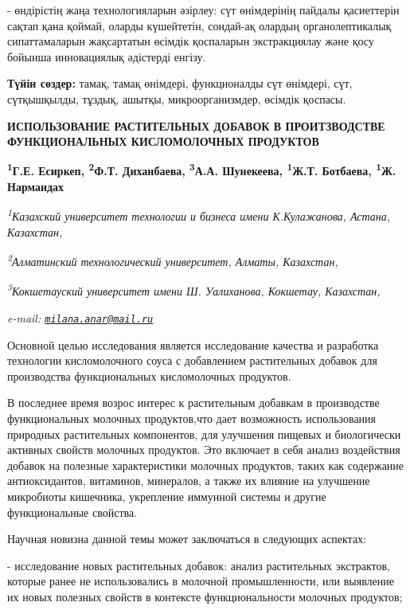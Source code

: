 - өндірістің жаңа технологияларын әзірлеу: сүт өнімдерінің пайдалы
қасиеттерін сақтап қана қоймай, оларды күшейтетін, сондай-ақ олардың
органолептикалық сипаттамаларын жақсартатын өсімдік қоспаларын
экстракциялау және қосу бойынша инновациялық әдістерді енгізу.

{\bfseries Түйін сөздер:} тамақ, тамақ өнімдері, функционалды сүт өнімдері,
сүт, сүтқышқылды, тұздық, ашытқы, микроорганизмдер, өсімдік қоспасы.

\begin{articleheader}
{\bfseries ИСПОЛЬЗОВАНИЕ РАСТИТЕЛЬНЫХ ДОБАВОК В ПРОИТЗВОДСТВЕ ФУНКЦИОНАЛЬНЫХ КИСЛОМОЛОЧНЫХ ПРОДУКТОВ}

{\bfseries
\textsuperscript{1}Г.Е. Есиркеп\textsuperscript{\envelope },
\textsuperscript{2}Ф.Т. Диханбаева,
\textsuperscript{3}А.А. Шунекеева,
\textsuperscript{1}Ж.Т. Ботбаева,
\textsuperscript{1}Ж. Нармандах}
\end{articleheader}

\begin{affiliation}
\emph{\textsuperscript{1}Казахский университет технологии и бизнеса имени К.Кулажанова, Астана, Казахстан,}

\emph{\textsuperscript{2}Алматинский технологический университет, Алматы, Казахстан,}

\emph{\textsuperscript{3}Кокшетауский университет имени Ш. Уалиханова, Кокшетау, Казахстан,}

\emph{e-mail: \href{mailto:milana.anar@mail.ru}{\nolinkurl{milana.anar@mail.ru}}}
\end{affiliation}

Основной целью исследования является исследование качества и разработка
технологии кисломолочного соуса с добавлением растительных добавок для
производства функциональных кисломолочных продуктов.

В последнее время возрос интерес к растительным добавкам в производстве
функциональных молочных продуктов,что дает возможность использования
природных растительных компонентов, для улучшения пищевых и биологически
активных свойств молочных продуктов. Это включает в себя анализ
воздействия добавок на полезные характеристики молочных продуктов, таких
как содержание антиоксидантов, витаминов, минералов, а также их влияние
на улучшение микробиоты кишечника, укрепление иммунной системы и другие
функциональные свойства.

Научная новизна данной темы может заключаться в следующих
аспектах:

- исследование новых растительных добавок: анализ растительных
экстрактов, которые ранее не использовались в молочной промышленности,
или выявление их новых полезных свойств в контексте функциональности
молочных продуктов;

